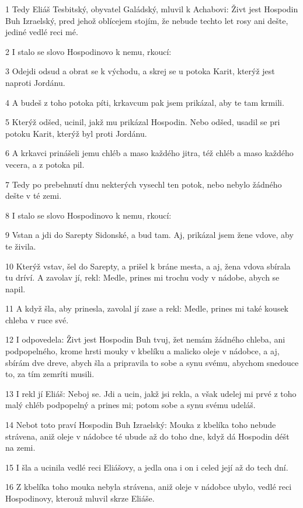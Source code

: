 \par 1 Tedy Eliáš Tesbitský, obyvatel Galádský, mluvil k Achabovi: Živt jest Hospodin Buh Izraelský, pred jehož oblícejem stojím, že nebude techto let rosy ani dešte, jediné vedlé reci mé.
\par 2 I stalo se slovo Hospodinovo k nemu, rkoucí:
\par 3 Odejdi odsud a obrat se k východu, a skrej se u potoka Karit, kterýž jest naproti Jordánu.
\par 4 A budeš z toho potoka píti, krkavcum pak jsem prikázal, aby te tam krmili.
\par 5 Kterýž odšed, ucinil, jakž mu prikázal Hospodin. Nebo odšed, usadil se pri potoku Karit, kterýž byl proti Jordánu.
\par 6 A krkavci prinášeli jemu chléb a maso každého jitra, též chléb a maso každého vecera, a z potoka pil.
\par 7 Tedy po prebehnutí dnu nekterých vysechl ten potok, nebo nebylo žádného dešte v té zemi.
\par 8 I stalo se slovo Hospodinovo k nemu, rkoucí:
\par 9 Vstan a jdi do Sarepty Sidonské, a bud tam. Aj, prikázal jsem žene vdove, aby te živila.
\par 10 Kterýž vstav, šel do Sarepty, a prišel k bráne mesta, a aj, žena vdova sbírala tu dríví. A zavolav jí, rekl: Medle, prines mi trochu vody v nádobe, abych se napil.
\par 11 A když šla, aby prinesla, zavolal jí zase a rekl: Medle, prines mi také kousek chleba v ruce své.
\par 12 I odpovedela: Živt jest Hospodin Buh tvuj, žet nemám žádného chleba, ani podpopelného, krome hrsti mouky v kbelíku a malicko oleje v nádobce, a aj, sbírám dve dreve, abych šla a pripravila to sobe a synu svému, abychom snedouce to, za tím zemríti musili.
\par 13 I rekl jí Eliáš: Neboj se. Jdi a ucin, jakž jsi rekla, a však udelej mi prvé z toho malý chléb podpopelný a prines mi; potom sobe a synu svému udeláš.
\par 14 Nebot toto praví Hospodin Buh Izraelský: Mouka z kbelíka toho nebude strávena, aniž oleje v nádobce té ubude až do toho dne, když dá Hospodin déšt na zemi.
\par 15 I šla a ucinila vedlé reci Eliášovy, a jedla ona i on i celed její až do tech dní.
\par 16 Z kbelíka toho mouka nebyla strávena, aniž oleje v nádobce ubylo, vedlé reci Hospodinovy, kterouž mluvil skrze Eliáše.
